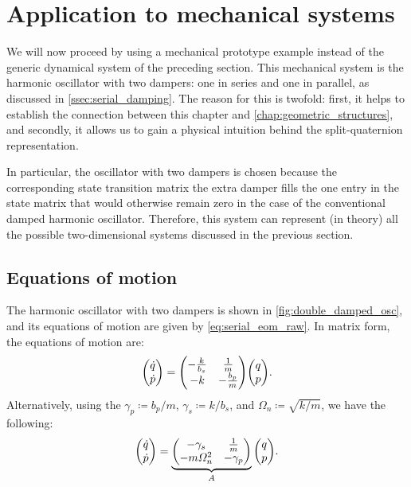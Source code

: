 \section{Application to mechanical systems}
\label{sec:mechanical}
We will now proceed by using a mechanical prototype example instead of the generic dynamical system of the preceding section. This mechanical system is the harmonic oscillator with two dampers: one in series and one in parallel, as discussed in \cref{ssec:serial_damping}. The reason for this is twofold: first, it helps to establish the connection between this chapter and \cref{chap:geometric_structures}, and secondly, it allows us to gain a physical intuition behind the split-quaternion representation. 

In particular, the oscillator with two dampers is chosen because the corresponding state transition matrix the extra damper fills the one entry in the state matrix that would otherwise remain zero in the case of the conventional damped harmonic oscillator. Therefore, this system can represent (in theory) all the possible two-dimensional systems discussed in the previous section.

\subsection{Equations of motion}
The harmonic oscillator with two dampers is shown in \cref{fig:double_damped_osc}, and its equations of motion are given by \cref{eq:serial_eom_raw}. In matrix form, the equations of motion are:
\begin{equation*}
    \mqty(\dot{q}\\\dot{p}) = \mqty(-\tfrac{k}{b_s} & \tfrac{1}{m} \\ -k & - \tfrac{b_p}{m})\mqty(q \\ p).
\end{equation*}
Alternatively, using the \(\gamma_p \coloneq b_p/m\), \(\gamma_s \coloneq k/b_s\), and \(\Omega_n \coloneq \sqrt{k/m}\), we have the following:
\begin{equation}
    \mqty(\dot{q}\\\dot{p}) = \underbrace{\mqty(-\gamma_s & \frac{1}{m} \\ -m\Omega_n^2 & - \gamma_p)}_A \mqty(q \\ p).
    \label{eq:ddho_eom}
\end{equation}

